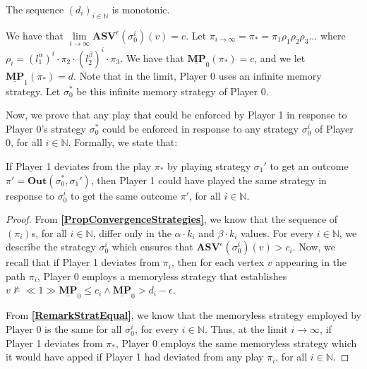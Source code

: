 \begin{proposition}
    \label{PropMonotonicDi}
    The sequence $(d_i)_{i \in \mathbb{N}}$ is monotonic. 
\end{proposition}

We have that $\lim \limits_{i \to \infty} \mathbf{ASV}^{\epsilon}(\sigma_0^i)(v) = c$. Let $\pi_{i \to \infty} = \pi_* = \pi_1 \rho_1 \rho_2 \rho_3 \dotsc$ where $\rho_i = (l^{\alpha}_{1})^i \cdot \pi_{2} \cdot (l^{\beta}_{2})^i \cdot \pi_{3}$. We have that $\underline{\mathbf{MP}}_0(\pi_*) = c$, and we let $\underline{\mathbf{MP}}_1(\pi_*) = d$. Note that in the limit, Player 0 uses an infinite memory strategy. Let $\sigma_0^*$ be this infinite memory strategy of Player 0.

Now, we prove that any play that could be enforced by Player 1 in response to Player 0's strategy $\sigma_0^*$ could be enforced in response to any strategy $\sigma_0^i$ of Player 0, for all $i \in \mathbb{N}$. Formally, we state that:

\begin{proposition}
    \label{PropContradictionPlayEnforcable}
    If Player 1 deviates from the play $\pi_*$ by playing strategy $\sigma_1'$ to get an outcome $\pi' = \mathbf{Out}(\sigma_0^*, \sigma_1')$, then Player 1 could have played the same strategy in response to $\sigma_0^i$ to get the same outcome $\pi'$, for all $i \in \mathbb{N}$. 
\end{proposition}
\begin{proof}
    From \textbf{\cref{PropConvergenceStrategies}}, we know that the sequence of $(\pi_i)$s, for all $i \in \mathbb{N}$, differ only in the $\alpha \cdot k_i$ and $\beta \cdot k_i$ values.
    For every $i \in \mathbb{N}$, we describe the strategy $\sigma_0^i$ which ensures that $\mathbf{ASV}^{\epsilon}(\sigma_0^i)(v) > c_i$. Now, we recall that if Player 1 deviates from $\pi_i$, then for each vertex $v$ appearing in the path $\pi_i$, Player 0 employs a memoryless strategy that establishes $v \nvDash \ll 1 \gg \underline{\mathbf{MP}}_0 \leqslant c_i \land \underline{\mathbf{MP}}_0 > d_i - \epsilon$.

    From \textbf{\cref{RemarkStratEqual}}, we know that the memoryless strategy employed by Player 0 is the same for all $\sigma_0^i$, for every $i \in \mathbb{N}$. Thus, at the limit $i \to \infty$, if Player 1 deviates from $\pi_*$, Player 0 employs the same memoryless strategy which it would have apped if Player 1 had deviated from any play $\pi_i$, for all $i \in \mathbb{N}$.
\end{proof}

